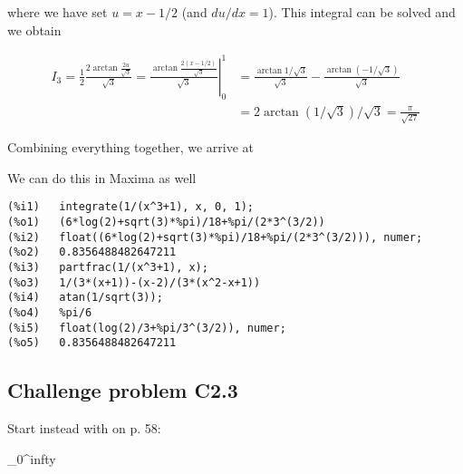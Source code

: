where we have set $u=x-1/2$ (and $du/dx=1$). This integral can be solved and we obtain

\begin{align*}
I_3 = \frac{1}{2} \frac{2 \arctan \frac{2u}{\sqrt{3}}}{\sqrt{3}} = \left. \frac{ \arctan \frac{2(x-1/2)}{\sqrt{3}}}{\sqrt{3}} \right|_0^1 & = \frac{\arctan 1/\sqrt{3}}{\sqrt{3}} - \frac{\arctan \left(-1/\sqrt{3}\right) }{\sqrt{3}} \\ & = 2 \arctan \left(1/\sqrt{3}\right)/\sqrt{3} = \frac{\pi}{\sqrt{27}}
\end{align*}

Combining everything together, we arrive at

\bee
{}
\eee

We can do this in Maxima as well

\begin{verbatim}
(%i1)	integrate(1/(x^3+1), x, 0, 1);
(%o1)	(6*log(2)+sqrt(3)*%pi)/18+%pi/(2*3^(3/2))
(%i2)	float((6*log(2)+sqrt(3)*%pi)/18+%pi/(2*3^(3/2))), numer;
(%o2)	0.8356488482647211
(%i3)	partfrac(1/(x^3+1), x);
(%o3)	1/(3*(x+1))-(x-2)/(3*(x^2-x+1))
(%i4)	atan(1/sqrt(3));
(%o4)	%pi/6
(%i5)	float(log(2)/3+%pi/3^(3/2)), numer;
(%o5)	0.8356488482647211
\end{verbatim}


\subsection{Challenge problem  C2.3}

Start instead with on p. 58:

\bee
\int_0^infty 
\eee